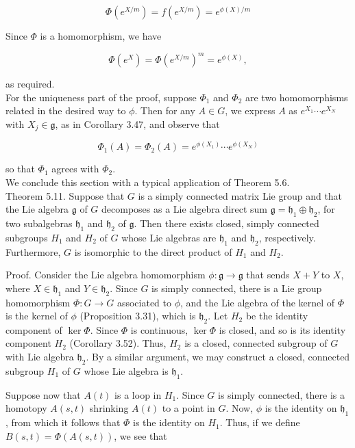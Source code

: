 \documentclass[10pt, letterpaper]{article}
\begin{document}
$$
\Phi\left(e^{X / m}\right)=f\left(e^{X / m}\right)=e^{\phi(X) / m}
$$

Since $\Phi$ is a homomorphism, we have

$$
\Phi\left(e^{X}\right)=\Phi\left(e^{X / m}\right)^{m}=e^{\phi(X)},
$$

as required.\\
For the uniqueness part of the proof, suppose $\Phi_{1}$ and $\Phi_{2}$ are two homomorphisms related in the desired way to $\phi$. Then for any $A \in G$, we express $A$ as $e^{X_{1}} \cdots e^{X_{N}}$ with $X_{j} \in \mathfrak{g}$, as in Corollary 3.47, and observe that

$$
\Phi_{1}(A)=\Phi_{2}(A)=e^{\phi\left(X_{1}\right)} \cdots e^{\phi\left(X_{N}\right)}
$$

so that $\Phi_{1}$ agrees with $\Phi_{2}$.\\
We conclude this section with a typical application of Theorem 5.6.\\
Theorem 5.11. Suppose that $G$ is a simply connected matrix Lie group and that the Lie algebra $\mathfrak{g}$ of $G$ decomposes as a Lie algebra direct sum $\mathfrak{g}=\mathfrak{h}_{1} \oplus \mathfrak{h}_{2}$, for two subalgebras $\mathfrak{h}_{1}$ and $\mathfrak{h}_{2}$ of $\mathfrak{g}$. Then there exists closed, simply connected subgroups $H_{1}$ and $H_{2}$ of $G$ whose Lie algebras are $\mathfrak{h}_{1}$ and $\mathfrak{h}_{2}$, respectively. Furthermore, $G$ is isomorphic to the direct product of $H_{1}$ and $H_{2}$.

Proof. Consider the Lie algebra homomorphism $\phi: \mathfrak{g} \rightarrow \mathfrak{g}$ that sends $X+Y$ to $X$, where $X \in \mathfrak{h}_{1}$ and $Y \in \mathfrak{h}_{2}$. Since $G$ is simply connected, there is a Lie group homomorphism $\Phi: G \rightarrow G$ associated to $\phi$, and the Lie algebra of the kernel of $\Phi$ is the kernel of $\phi$ (Proposition 3.31), which is $\mathfrak{h}_{2}$. Let $H_{2}$ be the identity component of $\operatorname{ker} \Phi$. Since $\Phi$ is continuous, $\operatorname{ker} \Phi$ is closed, and so is its identity component $H_{2}$ (Corollary 3.52). Thus, $H_{2}$ is a closed, connected subgroup of $G$ with Lie algebra $\mathfrak{h}_{2}$. By a similar argument, we may construct a closed, connected subgroup $H_{1}$ of $G$ whose Lie algebra is $\mathfrak{h}_{1}$.

Suppose now that $A(t)$ is a loop in $H_{1}$. Since $G$ is simply connected, there is a homotopy $A(s, t)$ shrinking $A(t)$ to a point in $G$. Now, $\phi$ is the identity on $\mathfrak{h}_{1}$, from which it follows that $\Phi$ is the identity on $H_{1}$. Thus, if we define $B(s, t)= \Phi(A(s, t))$, we see that
\end{document}

